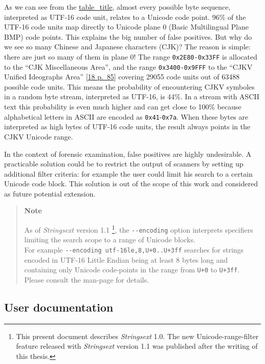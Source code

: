 As we can see from the
\protect\hyperlink{utf-16-bit-distribution}{table\_title}, almost every
possible byte sequence, interpreted as UTF-16 code unit, relates to a
Unicode code point. 96\% of the UTF-16 code units map directly to
Unicode plane 0 (Basic Multilingual Plane BMP) code points. This
explains the big number of false positives. But why do we see so many
Chinese and Japanese characters (CJK)? The reason is simple: there are
just so many of them in plane 0! The range \texttt{0x2E80-0x33FF} is
allocated to the ``CJK Miscellaneous Area'', and the range
\texttt{0x3400-0x9FFF} to the ``CJKV Unified Ideographs Area''
{[}\protect\hyperlink{unicodeconsortium2016}{18 p.~85}{]} covering 29055
code units out of 63488 possible code units. This means the probability
of encountering CJKV symboles in a random byte stream, interpreted as
UTF-16, is 44\%. In a stream with ASCII text this probability is even
much higher and can get close to 100\% because alphabetical letters in
ASCII are encoded as \texttt{0x41}-\texttt{0x7a}. When these bytes are
interpreted as high bytes of UTF-16 code units, the result always points
in the CJKV Unicode range.

In the context of forensic examination, false positives are highly
undesirable. A practicable solution could be to restrict the output of
scanners by setting up additional filter criteria: for example the user
could limit his search to a certain Unicode code block. This solution is
out of the scope of this work and considered as future potential
extension.

\begin{quote}
\textbf{Note}

As of \emph{Stringsext} version 1.1 \footnote{This present document
  describes \emph{Stringsext} 1.0. The new Unicode-range-filter feature
  released with \emph{Stringsext} version 1.1 was published after the
  writing of this thesis.}, the \texttt{-\/-encoding} option interprets
specifiers limiting the search scope to a range of Unicode blocks.\\
For example \texttt{-\/-encoding\ utf-16le,8,U+0..U+3ff} searches for
strings encoded in UTF-16 Little Endian being at least 8 bytes long and
containing only Unicode code-points in the range from \texttt{U+0} to
\texttt{U+3ff}. Please consult the man-page for details.
\end{quote}

\subsection{User documentation}\label{_user_documentation}

